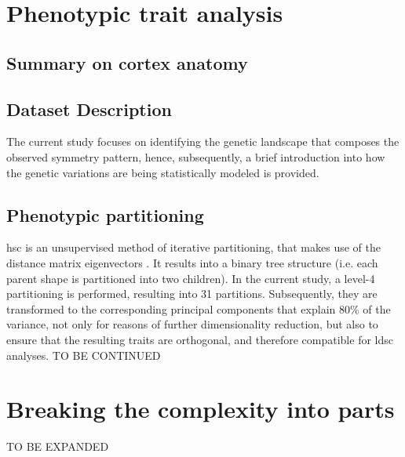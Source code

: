 \section{Phenotypic trait analysis}\label{sec:phenotype_intro}
\subsection{Summary on cortex anatomy}
 
\subsection{Dataset Description}
 

The current study focuses on identifying the genetic landscape that composes the observed symmetry pattern, hence, subsequently, a brief introduction into how the genetic variations are being statistically modeled is provided.




\citet{Sha2021}


\subsection{Phenotypic partitioning}\label{sec:hsc}
\Acf{hsc} is an unsupervised method of iterative partitioning, that makes use of the distance matrix eigenvectors \cite{Ng2002}. It results into a binary tree structure (i.e. each parent shape is partitioned into two children). In the current study, a level-4 partitioning is performed, resulting into 31 partitions. Subsequently, they are transformed to the corresponding principal components that explain 80\% of the variance, not only for reasons of further dimensionality reduction, but also to ensure that the resulting traits are orthogonal, and therefore compatible for \ac{ldsc} analyses. TO BE CONTINUED




\section{Breaking the complexity into parts}
TO BE EXPANDED

